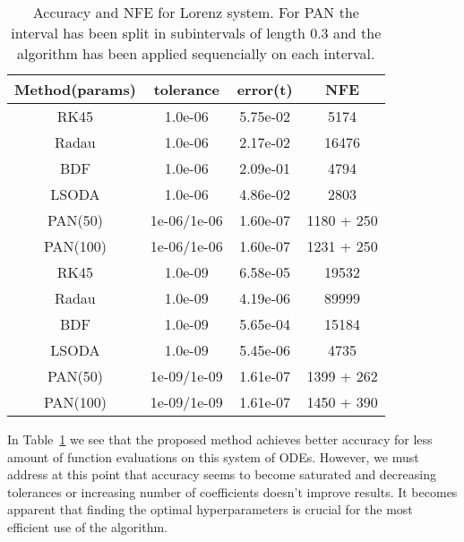 \documentclass[11pt]{report}
\begin{document}
    \begin{table}[!h]
        \begin{center}
            \caption{Accuracy and NFE for Lorenz system. For PAN the interval has been split in subintervals of length
                $0.3$ and the algorithm has been applied sequencially on each interval.}
            \label{lorenz_metric}
            \renewcommand{\arraystretch}{1.5}
            \renewcommand{\tabcolsep}{10.25pt}
            \begin{tabular}{|c|c|c|c|}
                \hline
                Method(params) & tolerance & error(t) & NFE \\
                \hline
                RK45 & 1.0e-06 & 5.75e-02 & 5174
                \\ \hline
                Radau & 1.0e-06 & 2.17e-02 & 16476
                \\ \hline
                BDF & 1.0e-06 & 2.09e-01 & 4794
                \\ \hline
                LSODA & 1.0e-06 & 4.86e-02 & 2803
                \\ \hline
                PAN(50) & 1e-06/1e-06 & 1.60e-07 & 1180 + 250
                \\ \hline
                PAN(100) & 1e-06/1e-06 & 1.60e-07 & 1231 + 250
                \\ \hline\hline
                RK45 & 1.0e-09 & 6.58e-05 & 19532
                \\ \hline
                Radau & 1.0e-09 & 4.19e-06 & 89999
                \\ \hline
                BDF & 1.0e-09 & 5.65e-04 & 15184
                \\ \hline
                LSODA & 1.0e-09 & 5.45e-06 & 4735
                \\ \hline
                PAN(50) & 1e-09/1e-09 & 1.61e-07 & 1399 + 262
                \\ \hline
                PAN(100) & 1e-09/1e-09 & 1.61e-07 & 1450 + 390
                \\ \hline
            \end{tabular}
        \end{center}
    \end{table}

    In Table~\ref{lorenz_metric} we see that the proposed method achieves better accuracy for less amount of function
    evaluations on this system of ODEs.
    However, we must address at this point that accuracy seems to become saturated and decreasing tolerances or increasing number
    of coefficients doesn't improve results.
    It becomes apparent that finding the optimal hyperparameters is crucial for the most efficient use of the algorithm.
\end{document}
